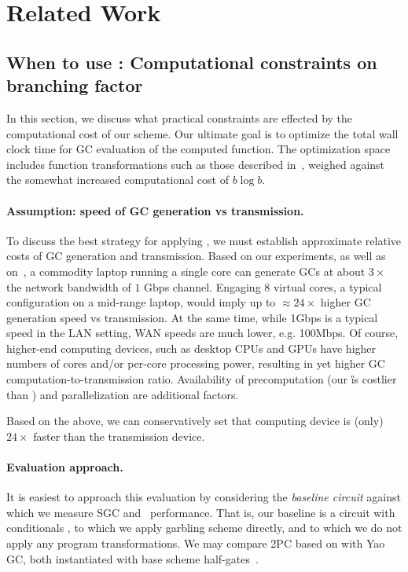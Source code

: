 \section{Related Work}\label{sec:relwork}

\subsection{When to use \ourscheme: Computational constraints on branching factor}

In this section, we discuss what practical constraints are effected by the computational cost of our scheme.  
Our ultimate goal is to optimize the total wall clock time for GC evaluation of the computed function.  The optimization space includes function transformations such as those described in~, weighed against the somewhat increased computational cost of $b\log b$.


\paragraph{Assumption: speed of GC generation vs transmission.}  To discuss the best strategy for applying \ourscheme, we must establish approximate relative costs of GC generation and transmission.  Based on our experiments, as well as on~\cite{XiaoPersonalComm}, a commodity laptop running a single core can generate GCs at about $3\times$ the network bandwidth of $1$ Gbps channel.  Engaging  $8$ virtual cores, a typical configuration on a mid-range laptop, would imply up to $\approx 24\times$ higher GC generation speed vs transmission.   At the same time, while 1Gbps is a typical speed in the LAN setting, WAN speeds are much lower, e.g. 100Mbps.  Of course, higher-end computing devices, such as desktop CPUs and GPUs have higher numbers of cores and/or per-core processing power, resulting in yet higher GC computation-to-transmission ratio.  Availability of precomputation (our \G is costlier than \E) and parallelization are additional factors.

Based on the above, we can conservatively set that computing device is (only) $24\times$ faster than the transmission device.




\paragraph{Evaluation approach.}  It is easiest to approach this evaluation by considering the {\em baseline circuit} against which we measure SGC and \ourscheme\ performance.    That is, our baseline is a circuit with conditionals \cir, to which we apply garbling scheme directly, and to which we do not apply any program transformations.  We may compare 2PC based on \ourscheme with  Yao GC, both instantiated with base scheme half-gates~\cite{EC:ZahRosEva15}.



